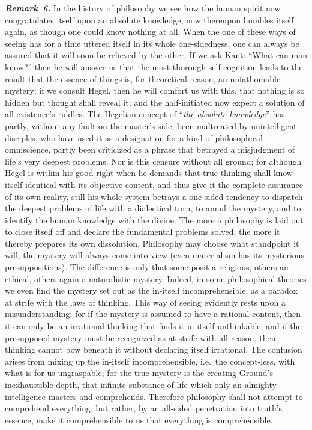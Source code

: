\documentclass[12pt]{book}
\newcommand{\anm}[1]{\emph{\textbf{Remark~#1.}}}
\begin{document}
\anm{6} In the history of philosophy we see how the human spirit now
congratulates itself upon an absolute knowledge, now thereupon humbles
itself again, as though one could know nothing at all. When the one of these
ways of seeing has for a time uttered itself in its whole one-sidedness, one
can always be assured that it will soon be relieved by the other. If we ask
Kant: ``What can man know?'' then he will answer us that the most thorough
self-cognition leads to the result that the essence of things is, for
theoretical reason, an unfathomable mystery; if we consult Hegel, then he
will comfort us with this, that nothing is so hidden but thought shall
reveal it; and the half-initiated now expect a solution of all existence's
riddles. The Hegelian concept of ``\emph{the absolute knowledge}'' has
partly, without any fault on the master's side, been maltreated by
unintelligent disciples, who have used it as a designation for a kind of
philosophical omniscience, partly been criticized as a phrase that betrayed
a misjudgment of life's very deepest problems. Nor is this censure without
all ground; for although Hegel is within his good right when he demands that
true thinking shall know itself identical with its objective content, and
thus give it the complete assurance of its own reality, still his whole
system betrays a one-sided tendency to dispatch the deepest problems of life
with a dialectical turn, to annul the mystery, and to identify the human
knowledge with the divine. The more a philosophy is laid out to close itself
off and declare the fundamental problems solved, the more it thereby
prepares its own dissolution. Philosophy may choose what standpoint it will,
the mystery will always come into view (even materialism has its mysterious
presuppositions). The difference is only that some posit a religious, others
an ethical, others again a naturalistic mystery. Indeed, in some
philosophical theories we even find the mystery set out as the in-itself
incomprehensible, as a paradox at strife with the laws of thinking. This way
of seeing evidently rests upon a misunderstanding; for if the mystery is
assumed to have a rational content, then it can only be an irrational
thinking that finds it in itself unthinkable; and if the presupposed mystery
must be recognized as at strife with all reason, then thinking cannot bow
beneath it without declaring itself irrational. The confusion arises from
mixing up the in-itself incomprehensible, i.e.\ the concept-less, with what
is for us ungraspable; for the true mystery is the creating Ground's
inexhaustible depth, that infinite substance of life which only an almighty
intelligence masters and comprehends. Therefore philosophy shall not attempt
to comprehend everything, but rather, by an all-sided penetration into
truth's essence, make it comprehensible to us that everything is
comprehensible.
\end{document}
